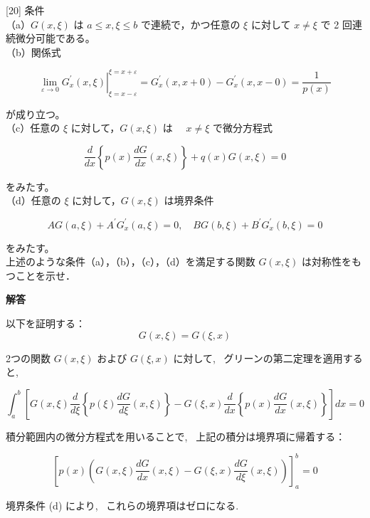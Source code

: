\documentclass{jsarticle}
\begin{document}
\begin{itembox}[l]{[20]}
条件\\
（a）$G(x, \xi)$ は $a \leqslant x, \xi \leqslant b$ で連続で，かつ任意の $\xi$ に対して $x \neq \xi$ で 2 回連続微分可能である。\\
（b）関係式


\begin{equation*}
\left.\lim _{\varepsilon \rightarrow 0} G_{x}^{\prime}(x, \xi)\right|_{\xi=x-\varepsilon} ^{\xi=x+\varepsilon}=G_{x}^{\prime}(x, x+0)-G_{x}^{\prime}(x, x-0)=\frac{1}{p(x)} \tag{34}
\end{equation*}


が成り立つ。\\
（c）任意の $\xi$ に対して，$G(x, \xi)$ は $\quad x \neq \xi$ で微分方程式


\begin{equation*}
\frac{d}{d x}\left\{p(x) \frac{d G}{d x}(x, \xi)\right\}+q(x) G(x, \xi)=0 \tag{35}
\end{equation*}


をみたす。\\
（d）任意の $\xi$ に対して，$G(x, \xi)$ は境界条件


\begin{equation*}
A G(a, \xi)+A^{\prime} G_{x}^{\prime}(a, \xi)=0, \quad B G(b, \xi)+B^{\prime} G_{x}^{\prime}(b, \xi)=0 \tag{36}
\end{equation*}


をみたす。\\
上述のような条件（a），（b），（c），（d）を満足する関数 $G(x, \xi)$ は対称性をもつことを示せ．  
\end{itembox}

\textbf{解答}

以下を証明する：
\[
G(x, \xi) = G(\xi, x)
\]


2つの関数 \( G(x, \xi) \) および \( G(\xi, x) \) に対して, \ グリーンの第二定理を適用すると,

\[
\int_a^b \left[ G(x, \xi) \frac{d}{d\xi} \left\{ p(\xi) \frac{dG}{d\xi}(x, \xi) \right\} - G(\xi, x) \frac{d}{dx} \left\{ p(x) \frac{dG}{dx}(x, \xi) \right\} \right] dx = 0
\]

積分範囲内の微分方程式を用いることで, \ 上記の積分は境界項に帰着する：

\[
\left[ p(x) \left( G(x, \xi) \frac{dG}{dx}(x, \xi) - G(\xi, x) \frac{dG}{d\xi}(x, \xi) \right) \right]_a^b = 0
\]

境界条件 (d) により, \ これらの境界項はゼロになる.
\end{document}
